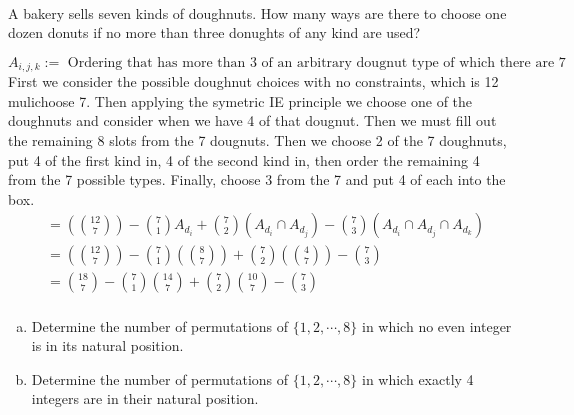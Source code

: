 \documentclass[12pt,letterpaper,boxed]{hmcpset}
\begin{document}
\begin{problem}[Shahriari 8.2.3][20]\\
A bakery sells seven kinds of doughnuts. How many ways are there to choose one dozen donuts if no more than three donughts of any kind are used?
\end{problem}

\begin{solution}
$$A_{i,j,k}:=\text{ Ordering that has more than 3 of an arbitrary dougnut type of which there are 7}$$
First we consider the possible doughnut choices with no constraints, which is 12 mulichoose 7. Then applying the symetric IE principle we choose one of the doughnuts and consider when we have 4 of that dougnut. Then we must fill out the remaining 8 slots from the 7 dougnuts. Then we choose 2 of the 7 doughnuts, put 4 of the first kind in, 4 of the second kind in, then order the remaining 4 from the 7 possible types. Finally, choose 3 from the 7 and put 4 of each into the box.
\begin{align*}
&=(\binom{12}{7}) - \binom{7}{1} A_{d_i} + \binom{7}{2} (A_{d_i} \cap A_{d_j}) - \binom{7}{3} (A_{d_i} \cap A_{d_j} \cap A_{d_k})\\
&=(\binom{12}{7}) - \binom{7}{1} (\binom{8}{7}) + \binom{7}{2} (\binom{4}{7}) - \binom{7}{3} \\
&=\boxed{\binom{18}{7} - \binom{7}{1} \binom{14}{7} + \binom{7}{2} \binom{10}{7} - \binom{7}{3}} \\
\end{align*}
\end{solution}

\begin{problem}[Shahriari 8.3.1][20]
\begin{enumerate}[(a)]
\item Determine the number of permutations of $\{1,2,\cdots, 8 \}$ in which no even integer is in its natural position.
\item Determine the number of permutations of $\{1,2,\cdots, 8 \}$ in which exactly 4 integers are in their natural position.
\end{enumerate}
\end{problem}
\end{document}
